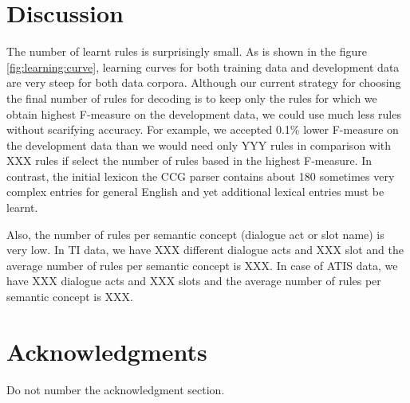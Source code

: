 \documentclass[11pt]{article}
\begin{document}
\section{Discussion}
The number of learnt rules is surprisingly small. As is shown in the figure \ref{fig:learning:curve}, learning curves for both training data and development data are very steep for both data corpora. Although our current strategy for choosing the final number of rules for decoding is to keep only the rules for which we obtain highest F-measure on the development data, we could use much less rules without scarifying accuracy. For example, we accepted 0.1\% lower F-measure on the development data than we would need only YYY rules in comparison with XXX rules if select the number of rules based in the highest F-measure.
In contrast, the initial lexicon the CCG parser \cite{zettlemoyer2007} contains about 180 sometimes very complex entries for general English and yet additional lexical entries must be learnt. 


Also, the number of rules per semantic concept (dialogue act or slot name) is very low. In TI data, we have XXX different dialogue acts and XXX slot and the average number of rules per semantic concept is XXX. In case of ATIS data, we have XXX dialogue acts and XXX slots and the average number of rules per semantic concept is XXX.

\section*{Acknowledgments}

Do not number the acknowledgment section.
\end{document}
